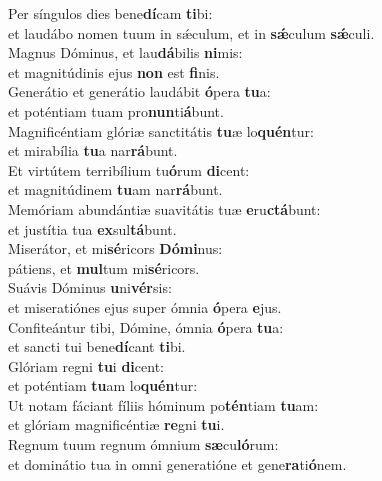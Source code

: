 \evenverse Per síngulos dies bene\textbf{dí}cam \textbf{ti}bi:~\*\\
\evenverse et laudábo nomen tuum in sǽculum, et in \textbf{sǽ}culum \textbf{sǽ}culi.\\
\oddverse Magnus Dóminus, et lau\textbf{dá}bilis \textbf{ni}mis:~\*\\
\oddverse et magnitúdinis ejus \textbf{non} est \textbf{fi}nis.\\
\evenverse Generátio et generátio laudábit \textbf{ó}pera \textbf{tu}a:~\*\\
\evenverse et poténtiam tuam pro\textbf{nun}ti\textbf{á}bunt.\\
\oddverse Magnificéntiam glóriæ sanctitátis \textbf{tu}æ lo\textbf{quén}tur:~\*\\
\oddverse et mirabília \textbf{tu}a nar\textbf{rá}bunt.\\
\evenverse Et virtútem terribílium tu\textbf{ó}rum \textbf{di}cent:~\*\\
\evenverse et magnitúdinem \textbf{tu}am nar\textbf{rá}bunt.\\
\oddverse Memóriam abundántiæ suavitátis tuæ \textbf{e}ru\textbf{ctá}bunt:~\*\\
\oddverse et justítia tua \textbf{ex}sul\textbf{tá}bunt.\\
\evenverse Miserátor, et mi\textbf{sé}ricors \textbf{Dó}\textbf{mi}nus:~\*\\
\evenverse pátiens, et \textbf{mul}tum mi\textbf{sé}ricors.\\
\oddverse Suávis Dóminus \textbf{u}ni\textbf{vér}sis:~\*\\
\oddverse et miseratiónes ejus super ómnia \textbf{ó}pera \textbf{e}jus.\\
\evenverse Confiteántur tibi, Dómine, ómnia \textbf{ó}pera \textbf{tu}a:~\*\\
\evenverse et sancti tui bene\textbf{dí}cant \textbf{ti}bi.\\
\oddverse Glóriam regni \textbf{tu}i \textbf{di}cent:~\*\\
\oddverse et poténtiam \textbf{tu}am lo\textbf{quén}tur:\\
\evenverse Ut notam fáciant fíliis hóminum po\textbf{tén}tiam \textbf{tu}am:~\*\\
\evenverse et glóriam magnificéntiæ \textbf{re}gni \textbf{tu}i.\\
\oddverse Regnum tuum regnum ómnium \textbf{sæ}cu\textbf{ló}rum:~\*\\
\oddverse et dominátio tua in omni generatióne et gene\textbf{ra}ti\textbf{ó}nem.\\
